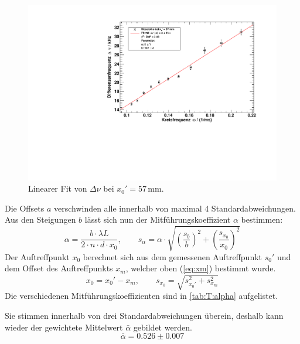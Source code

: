 \begin{figure}[H]
\begin{center}
  \includegraphics[width=\textwidth]{../img/fit_x0_57mm.pdf}
  \caption{Linearer Fit von $\Delta \nu$ bei $x_0' = 57$\,mm.}
  \label{img:fit:T:57mm}
\end{center}
\end{figure}



Die Offsets $a$ verschwinden alle innerhalb von maximal 4 Standardabweichungen. Aus den Steigungen $b$ lässt sich nun der Mitführungskoeffizient 
$\alpha$ bestimmen:
\begin{equation}
  \alpha = \frac{b \cdot \lambda L}{2 \cdot n \cdot d \cdot x_0}, \qquad
  s_\alpha = \alpha \cdot \sqrt{ \left( \frac{s_b}{b} \right)^2 + \left( \frac{s_{x_0}}{x_0} \right)^2 }
\end{equation}
Der Auftreffpunkt $x_0$ berechnet sich aus dem gemessenen Auftreffpunkt $s_0'$ und dem Offset des Auftreffpunkts $x_m$, welcher oben 
(\autoref{eq:xm}) bestimmt wurde.
\begin{equation}
  x_0 = x_0' - x_m, \qquad s_{x_0} = \sqrt{s_{x_0'}^2 + s_{x_m}^2}
\end{equation}
Die verschiedenen Mitführungskoeffizienten sind in \autoref{tab:T:alpha} aufgelistet.

Sie stimmen innerhalb von drei Standardabweichungen überein, deshalb kann wieder der gewichtete Mittelwert $\bar{\alpha}$ gebildet werden.
\begin{equation}
  \bar{\alpha} = 0.526 \pm 0.007
\end{equation}


